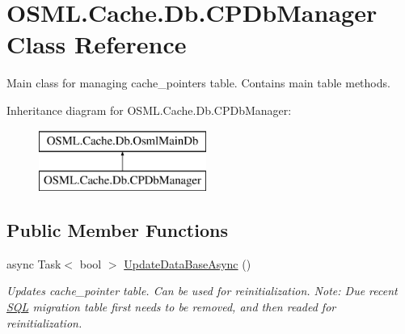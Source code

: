 \hypertarget{classOSML_1_1Cache_1_1Db_1_1CPDbManager}{}\section{O\+S\+M\+L.\+Cache.\+Db.\+C\+P\+Db\+Manager Class Reference}
\label{classOSML_1_1Cache_1_1Db_1_1CPDbManager}


Main class for managing cache\+\_\+pointers table. Contains main table methods.  


Inheritance diagram for O\+S\+M\+L.\+Cache.\+Db.\+C\+P\+Db\+Manager\+:\begin{figure}[H]
\begin{center}
\leavevmode
\includegraphics[height=2.000000cm]{classOSML_1_1Cache_1_1Db_1_1CPDbManager}
\end{center}
\end{figure}
\subsection*{Public Member Functions}
\begin{DoxyCompactItemize}
\item 
async Task$<$ bool $>$ \mbox{\hyperlink{classOSML_1_1Cache_1_1Db_1_1CPDbManager_aa379e13e88129489f76fd403a21e8f6c}{Update\+Data\+Base\+Async}} ()
\begin{DoxyCompactList}\small\item\em Updates cache\+\_\+pointer table. Can be used for reinitialization. Note\+: Due recent \mbox{\hyperlink{namespaceOSML_1_1SQL}{S\+QL}} migration table first needs to be removed, and then readed for reinitialization. \end{DoxyCompactList}\end{DoxyCompactItemize}
